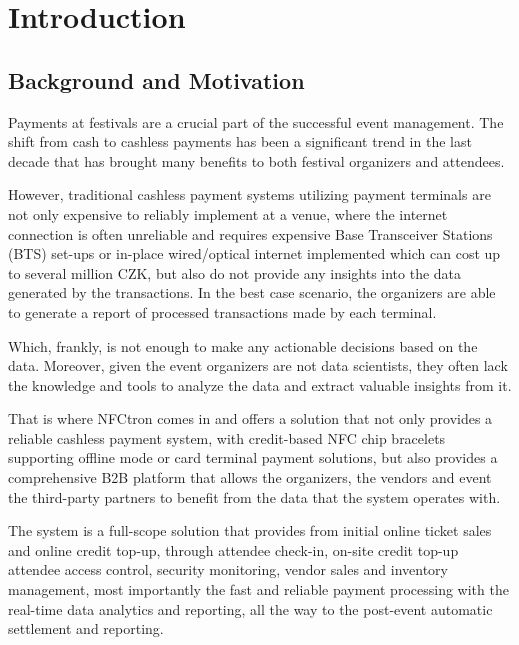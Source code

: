 \chapter*{Introduction}
\label{ch:introduction}


\section*{Background and Motivation}
\label{sec:introduction-background-motivation}
Payments at festivals are a crucial part of the successful event management.
The shift from cash to cashless payments has been a significant trend in the last decade that has brought many benefits to both festival organizers and attendees\cite{bl_en_waarom_festivals_overstappen_op_cashless_betalen}.

However, traditional cashless payment systems utilizing payment terminals are not only expensive to reliably implement at a venue, where the internet connection is often unreliable and requires expensive Base Transceiver Stations (BTS) set-ups or in-place wired/optical internet implemented which can cost up to several million CZK, but also do not provide any insights into the data generated by the transactions.
In the best case scenario, the organizers are able to generate a report of processed transactions made by each terminal.

Which, frankly, is not enough to make any actionable decisions based on the data.
Moreover, given the event organizers are not data scientists, they often lack the knowledge and tools to analyze the data and extract valuable insights from it.

That is where NFCtron comes in and offers a solution that not only provides a reliable cashless payment system, with credit-based NFC chip bracelets supporting offline mode or card terminal payment solutions, but also provides a comprehensive B2B platform that allows the organizers, the vendors and event the third-party partners to benefit from the data that the system operates with\cite{nfctron_en_company}.

The system is a full-scope solution that provides from initial online ticket sales and online credit top-up, through attendee check-in, on-site credit top-up attendee access control, security monitoring, vendor sales and inventory management, most importantly the fast and reliable payment processing with the real-time data analytics and reporting, all the way to the post-event automatic settlement and reporting.

